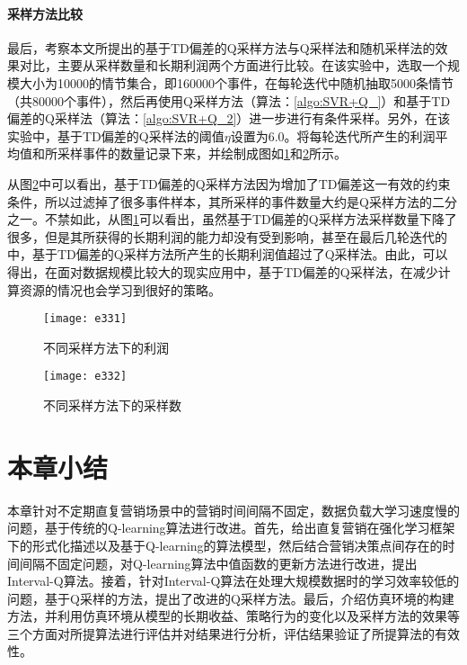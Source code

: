 \paragraph{采样方法比较}
最后，考察本文所提出的基于TD偏差的Q采样方法与Q采样法和随机采样法的效果对比，主要从采样数量和长期利润两个方面进行比较。在该实验中，选取一个规模大小为10000的情节集合，即160000个事件，在每轮迭代中随机抽取5000条情节（共80000个事件），然后再使用Q采样方法（算法：\ref{algo:SVR+Q_}）和基于TD偏差的Q采样法（算法：\ref{algo:SVR+Q_2}）进一步进行有条件采样。另外，在该实验中，基于TD偏差的Q采样法的阈值$\eta$设置为6.0。将每轮迭代所产生的利润平均值和所采样事件的数量记录下来，并绘制成图如\ref{fig:e331}和\ref{fig:e332}所示。

从图\ref{fig:e332}中可以看出，基于TD偏差的Q采样方法因为增加了TD偏差这一有效的约束条件，所以过滤掉了很多事件样本，其所采样的事件数量大约是Q采样方法的二分之一。不禁如此，从图\ref{fig:e331}可以看出，虽然基于TD偏差的Q采样方法采样数量下降了很多，但是其所获得的长期利润的能力却没有受到影响，甚至在最后几轮迭代的中，基于TD偏差的Q采样方法所产生的长期利润值超过了Q采样法。由此，可以得出，在面对数据规模比较大的现实应用中，基于TD偏差的Q采样法，在减少计算资源的情况也会学习到很好的策略。

\begin{figure}[htbp]
\centering
\texttt{[image: e331]}
\caption{不同采样方法下的利润}
\label{fig:e331}
\end{figure}

\begin{figure}[htbp]
\centering
\texttt{[image: e332]}
\caption{不同采样方法下的采样数}
\label{fig:e332}
\end{figure}


\section{本章小结}
本章针对不定期直复营销场景中的营销时间间隔不固定，数据负载大学习速度慢的问题，基于传统的Q-learning算法进行改进。首先，给出直复营销在强化学习框架下的形式化描述以及基于Q-learning的算法模型，然后结合营销决策点间存在的时间间隔不固定问题，对Q-learning算法中值函数的更新方法进行改进，提出Interval-Q算法。接着，针对Interval-Q算法在处理大规模数据时的学习效率较低的问题，基于Q采样的方法，提出了改进的Q采样方法。最后，介绍仿真环境的构建方法，并利用仿真环境从模型的长期收益、策略行为的变化以及采样方法的效果等三个方面对所提算法进行评估并对结果进行分析，评估结果验证了所提算法的有效性。

\cleardoublepage